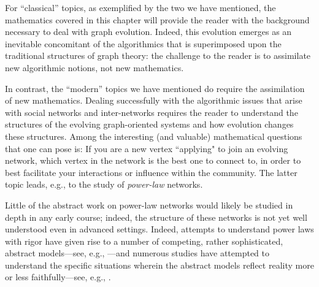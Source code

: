 For ``classical'' topics, as exemplified by the two we have mentioned, the mathematics covered
in this chapter will provide the reader with the background necessary to deal with graph evolution.
Indeed, this evolution emerges as an inevitable concomitant of the algorithmics that is superimposed 
upon the traditional structures of graph theory: the challenge to the reader is to assimilate new 
algorithmic notions, not new mathematics.

In contrast, the ``modern'' topics we have mentioned do require the assimilation of new 
mathematics.  Dealing successfully with the algorithmic issues that arise with social 
networks and inter-networks requires the reader to understand the structures of the
evolving graph-oriented systems and how evolution changes these structures.
Among the interesting (and valuable) mathematical questions that one can pose is: 
If you are a new vertex ``applying" to join an evolving network, which vertex in the network 
is the best one to connect to, in order to best facilitate your interactions or influence within 
the community.  The latter topic leads, e.g., to the study of {\em power-law} networks.

\bigskip

\noindent {}
\bigskip

Little of the abstract work on power-law networks would likely be studied in depth in any early
course; indeed, the structure of these networks is not yet well understood even in advanced settings.
Indeed, attempts to understand power laws with rigor have given rise to a number of competing, 
rather sophisticated, abstract models---see,
e.g., \cite{AielloCL00,BarabasiA99,Bollobas85,ChenCGJSW}---and
numerous studies have attempted to understand the specific situations wherein the abstract models
reflect reality more or less faithfully---see, e.g.,
\cite{BuT02,FaloutsosFF99,JaiswalRT04,TangmunarunkitGJSW02,ZeguraCD97}.


